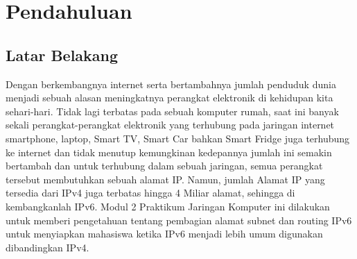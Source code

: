 \section{Pendahuluan}
\subsection{Latar Belakang}
Dengan berkembangnya internet serta bertambahnya jumlah penduduk dunia menjadi sebuah alasan meningkatnya perangkat elektronik di kehidupan kita sehari-hari. Tidak lagi terbatas pada sebuah komputer rumah, saat ini banyak sekali perangkat-perangkat elektronik yang terhubung pada jaringan internet smartphone, laptop, Smart TV, Smart Car bahkan Smart Fridge juga terhubung ke internet dan tidak menutup kemungkinan kedepannya jumlah ini semakin bertambah dan untuk terhubung dalam sebuah jaringan, semua perangkat tersebut membutuhkan sebuah alamat IP. Namun, jumlah Alamat IP yang tersedia dari IPv4 juga terbatas hingga 4 Miliar alamat, sehingga di kembangkanlah IPv6. Modul 2 Praktikum Jaringan Komputer ini dilakukan untuk memberi pengetahuan tentang pembagian alamat subnet dan routing IPv6 untuk menyiapkan mahasiswa ketika IPv6 menjadi lebih umum digunakan dibandingkan IPv4.

